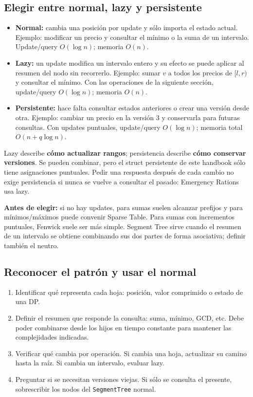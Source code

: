 \subsection{Elegir entre normal, lazy y persistente}
\begin{itemize}
\item \textbf{Normal:} cambia una posici\'on por update y s\'olo importa el
estado actual. Ejemplo: modificar un precio y consultar el m\'inimo o la
suma de un intervalo. Update/query $O(\log n)$; memoria $O(n)$.
\item \textbf{Lazy:} un update modifica un intervalo entero y su efecto
se puede aplicar al resumen del nodo sin recorrerlo. Ejemplo: sumar $v$
a todos los precios de $[l,r)$ y consultar el m\'inimo. Con las operaciones
de la siguiente secci\'on, update/query $O(\log n)$; memoria $O(n)$.
\item \textbf{Persistente:} hace falta consultar estados anteriores o
crear una versi\'on desde otra. Ejemplo: cambiar un precio en la versi\'on
3 y conservarla para futuras consultas. Con updates puntuales, update/query
$O(\log n)$; memoria total $O(n+q\log n)$.
\end{itemize}
Lazy describe \textbf{c\'omo actualizar rangos}; persistencia describe
\textbf{c\'omo conservar versiones}. Se pueden combinar, pero el struct
persistente de este handbook s\'olo tiene asignaciones puntuales.
Pedir una respuesta despu\'es de cada cambio no exige persistencia si
nunca se vuelve a consultar el pasado: Emergency Rations usa lazy.

\textbf{Antes de elegir:} si no hay updates, para sumas suelen alcanzar
prefijos y para m\'inimos/m\'aximos puede convenir Sparse Table. Para sumas
con incrementos puntuales, Fenwick suele ser m\'as simple. Segment Tree
sirve cuando el resumen de un intervalo se obtiene combinando sus dos
partes de forma asociativa; definir tambi\'en el neutro.

\subsection{Reconocer el patr\'on y usar el normal}
\begin{enumerate}
\item Identificar qu\'e representa cada hoja: posici\'on, valor comprimido
o estado de una DP.
\item Definir el resumen que responde la consulta: suma, m\'inimo, GCD,
etc. Debe poder combinarse desde los hijos en tiempo constante para
mantener las complejidades indicadas.
\item Verificar qu\'e cambia por operaci\'on. Si cambia una hoja, actualizar
su camino hasta la ra\'iz. Si cambia un intervalo, evaluar lazy.
\item Preguntar si se necesitan versiones viejas. Si s\'olo se consulta
el presente, sobrescribir los nodos del \texttt{SegmentTree} normal.
\end{enumerate}

